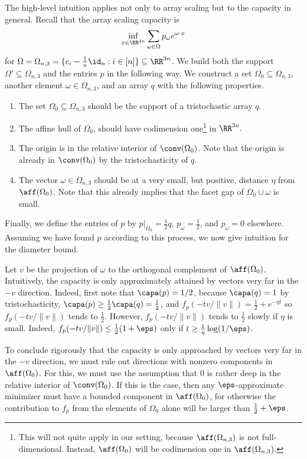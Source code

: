 The high-level intuition applies not only to array scaling but to the capacity in general. Recall that the array scaling capacity is 
$$ \inf_{x \in \RR^{3n}}  \sum_{\omega \in \Omega} p_{\omega} e^{\omega \cdot x} $$ for $\Omega =  \Omega_{n,3} = \{e_i - \frac1n \id_n: i \in [n]\} \subseteq \RR^{3n}$. We build both the support $\Omega'\subseteq \Omega_{n,3}$ and the entries $p$ in the following way. We construct a set $\Omega_0 \subseteq \Omega_{n,3}$, another element $\omega \in \Omega_{n,3}$, and an array $q$ with the following properties.
\begin{enumerate}
\item The set $\Omega_0 \subseteq \Omega_{n,3}$ should be the support of a tristochastic array $q$. 
\item The affine hull of $\Omega_0$, should have codimension one\footnote{This will not quite apply in our setting, because $\aff(\Omega_{n,3})$ is not full-dimensional. Instead, $\aff (\Omega_0)$ will be codimension one in $\aff(\Omega_{n,3})$.} in $\RR^{3n}.$ 
\item The origin is in the relative interior of $\conv(\Omega_0)$. Note that the origin is already in $\conv(\Omega_0)$ by the tristochasticity of $q$.
\item The vector $\omega \in \Omega_{n,3}$ should be at a very small, but positive, distance $\eta$ from $\aff (\Omega_0)$. Note that this already implies that the facet gap of $\Omega_0 \cup \omega$ is small.
\end{enumerate}
Finally, we define the entries of $p$ by $p|_{\Omega_0} = \frac{1}{2} q$, $p_\omega = \frac{1}{2}$, and $p_\omega = 0$ elsewhere. Assuming we have found $p$ according to this process, we now give intuition for the diameter bound.

Let $v$ be the projection of $\omega$ to the orthogonal complement of $\aff(\Omega_0)$. Intuitively, the capacity is only approximately attained by vectors very far in the $-v$ direction. Indeed, first note that $\capa(p) = 1/2$, because $\capa(q) = 1$ by tristochasticity, $\capa(p) \geq \frac{1}{2} \capa(q) = \frac{1}{2}$, and $f_p(- tv/\|v\|) = \frac{1}{2} + e^{ - \eta t}$ so $f_p(- tv/\|v\|)$ tends to $\frac 12$. However, $f_p( - t v/\|v\|)$ tends to $\frac 12$ slowly if $\eta$ is small. Indeed, $f_p( - t v/\|v\|) \leq \frac{1}{2}(1 + \eps)$ only if $t \geq \frac{1}{\eta} \log (1/\eps)$. 

To conclude rigorously that the capacity is only approached by vectors very far in the $-v$ direction, we must rule out directions with nonzero components in $\aff(\Omega_0)$. For this, we must use the assumption that $0$ is rather deep in the relative interior of $\conv(\Omega_0)$. If this is the case, then any $\eps$-approximate minimizer must have a bounded component in $\aff(\Omega_0)$, for otherwise the contribution to $f_p$ from the elements of $\Omega_0$ alone will be larger than $\frac{1}{2} + \eps$. 

